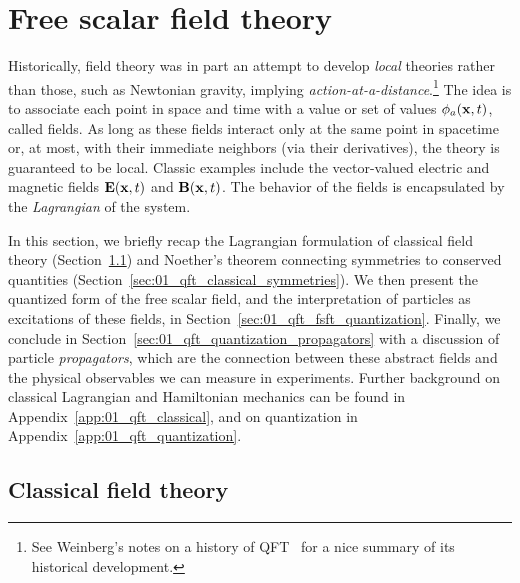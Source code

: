 \section{Free scalar field theory}
\label{sec:01_qft_classical}

Historically, field theory was in part an attempt to develop \textit{local} theories rather than those, such as Newtonian gravity, implying \textit{action-at-a-distance}.\footnote{See Weinberg's notes on a history of QFT~\cite{WeinbergHistoryQFT} for a nice summary of its historical development.}
The idea is to associate each point in space and time with a value or set of values $\phi_a(\mathbf{x}, t)$, called fields.
As long as these fields interact only at the same point in spacetime or, at most, with their immediate neighbors (via their derivatives), the theory is guaranteed to be local.
Classic examples include the vector-valued electric and magnetic fields $\mathbf{E}(\mathbf{x}, t)$ and $\mathbf{B}(\mathbf{x}, t)$.
The behavior of the fields is encapsulated by the \textit{Lagrangian} of the system.

In this section, we briefly recap the Lagrangian formulation of classical field theory (Section~\ref{sec:01_qft_classical_fsft}) and Noether's theorem connecting symmetries to conserved quantities (Section~\ref{sec:01_qft_classical_symmetries}).
We then present the quantized form of the free scalar field, and the interpretation of particles as excitations of these fields, in Section~\ref{sec:01_qft_fsft_quantization}.
Finally, we conclude in Section~\ref{sec:01_qft_quantization_propagators} with a discussion of particle \textit{propagators}, which are the connection between these abstract fields and the physical observables we can measure in experiments.
Further background on classical Lagrangian and Hamiltonian mechanics can be found in Appendix~\ref{app:01_qft_classical}, and on quantization in Appendix~\ref{app:01_qft_quantization}.

\subsection{Classical field theory}
\label{sec:01_qft_classical_fsft}

